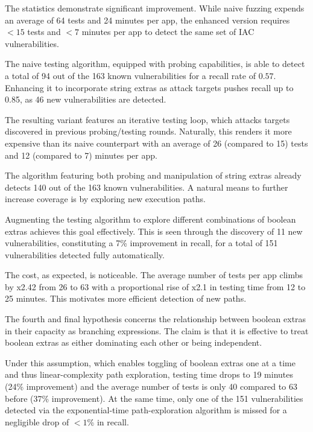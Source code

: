 The statistics demonstrate significant improvement. While naive fuzzing expends an average of 64 tests and 24 minutes per app, the enhanced version requires $<15$ tests and $<7$ minutes per app to detect the same set of IAC vulnerabilities.

 The naive testing algorithm, equipped with probing capabilities, is able to detect a total of 94 out of the 163 known vulnerabilities for a recall rate of $0.57$. Enhancing it to incorporate string extras as attack targets pushes recall up to 0.85, as 46 new vulnerabilities are detected.

The resulting variant features an iterative testing loop, which attacks targets discovered in previous probing/testing rounds. Naturally, this renders it more expensive than its naive counterpart with an average of 26 (compared to 15) tests and 12 (compared to 7) minutes per app.

 The algorithm featuring both probing and manipulation of string extras already detects 140 out of the 163 known vulnerabilities. A natural means to further increase coverage is by exploring new execution paths.

Augmenting the testing algorithm to explore different combinations of boolean extras achieves this goal effectively. This is seen through the discovery of 11 new vulnerabilities, constituting a 7\% improvement in recall, for a total of 151 vulnerabilities detected fully automatically. 

The cost, as expected, is noticeable. The average number of tests per app climbs by x2.42 from 26 to 63 with a proportional rise of x2.1 in testing time from 12 to 25 minutes. This motivates more efficient detection of new paths.

 The fourth and final hypothesis concerns the relationship between boolean extras in their capacity as branching expressions. The claim is that it is effective to treat boolean extras as either dominating each other or being independent.

Under this assumption, which enables toggling of boolean extras one at a time and thus linear-complexity path exploration, testing time drops to 19 minutes (24\% improvement) and the average number of tests is only 40 compared to 63 before (37\% improvement). At the same time, only one of the 151 vulnerabilities detected via the exponential-time path-exploration algorithm is missed for a negligible drop of $<1$\% in recall.

